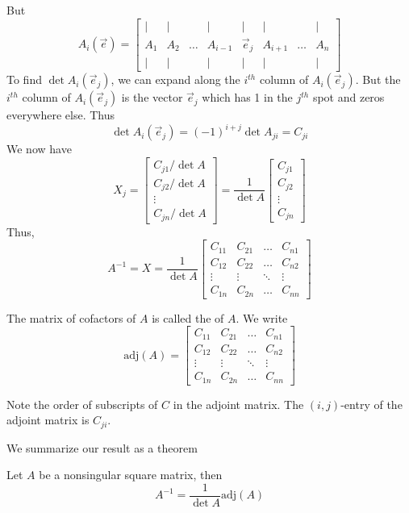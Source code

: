 \documentclass{ximera}
\begin{document}
But
$$A_i(\vec{e})=\begin{bmatrix}
           | & |& &|&|&|&&|\\
		A_1 & A_2&\dots &A_{i-1}&\vec{e}_j&A_{i+1}&\dots&A_n\\
		| & |& &|&|&|&&|
         \end{bmatrix}$$
To find $\det{A_i(\vec{e}_j)}$, we can expand along the $i^{th}$ column of $A_i(\vec{e}_j)$.  But the $i^{th}$ column of $A_i(\vec{e}_j)$ is the vector $\vec{e}_j$ which has 1 in the $j^{th}$ spot and zeros everywhere else.  Thus 
$$\det{A_i(\vec{e}_j)}=(-1)^{i+j}\det{A_{ji}}=C_{ji}$$
We now have
$$X_j=\begin{bmatrix}C_{j1}/\det{A}\\C_{j2}/\det{A}\\\vdots\\C_{jn}/\det{A}\end{bmatrix}=\frac{1}{\det{A}}\begin{bmatrix}C_{j1}\\C_{j2}\\\vdots\\C_{jn}\end{bmatrix}$$
Thus,
$$A^{-1}=X=\frac{1}{\det{A}}\begin{bmatrix}C_{11}&C_{21}&\ldots&C_{n1}\\C_{12}&C_{22}&\ldots&C_{n2}\\\vdots&\vdots&\ddots&\vdots\\
C_{1n}&C_{2n}&\ldots&C_{nn}\end{bmatrix}$$

The matrix of cofactors of $A$ is called the  of $A$.  We write
$$\text{adj}(A)=\begin{bmatrix}C_{11}&C_{21}&\ldots&C_{n1}\\C_{12}&C_{22}&\ldots&C_{n2}\\\vdots&\vdots&\ddots&\vdots\\
C_{1n}&C_{2n}&\ldots&C_{nn}\end{bmatrix}$$

\begin{warning}
Note the order of subscripts of $C$ in the adjoint matrix.  The $(i,j)$-entry of the adjoint matrix is $C_{ji}$.
\end{warning}

We summarize our result as a theorem 

\begin{theorem}\label{th:adjointinverseformula}
Let $A$ be a nonsingular square matrix, then
$$A^{-1}=\frac{1}{\det{A}}\mbox{adj}(A)$$
\end{theorem}
\end{document}
